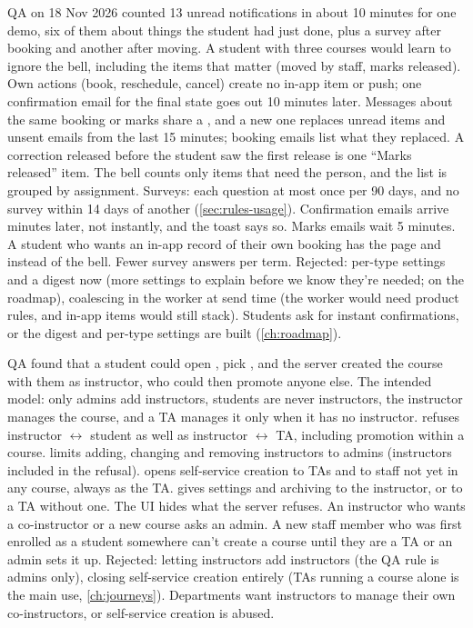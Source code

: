   {QA on 18 Nov 2026 counted 13 unread notifications in about 10 minutes for one demo, six of them
   about things the student had just done, plus a survey after booking and another after moving.
   A student with three courses would learn to ignore the bell, including the items that matter
   (moved by staff, marks released).}
  {Own actions (book, reschedule, cancel) create no in-app item or push; one confirmation email for
   the final state goes out 10 minutes later. Messages about the same booking or marks share a
   , and a new one replaces unread items and unsent emails from the last 15
   minutes; booking emails list what they replaced. A correction released before the student saw
   the first release is one ``Marks released'' item. The bell counts only items that need the
   person, and the list is grouped by assignment. Surveys: each question at most once per 90 days,
   and no survey within 14 days of another (\cref{sec:rules-usage}).}
  {Confirmation emails arrive minutes later, not instantly, and the toast says so. Marks emails wait
   5 minutes. A student who wants an in-app record of their own booking has the page and
    instead of the bell. Fewer survey answers per term. Rejected: per-type
   settings and a digest now (more settings to explain before we know they're needed; on the
   roadmap), coalescing in the worker at send time (the worker would need product rules, and
   in-app items would still stack).}
  {Students ask for instant confirmations, or the digest and per-type settings are built
   (\cref{ch:roadmap}).}

  {QA found that a student could open , pick , and the server
   created the course with them as instructor, who could then promote anyone else. The intended
   model: only admins add instructors, students are never instructors, the instructor manages the
   course, and a TA manages it only when it has no instructor.}
  { refuses instructor $\leftrightarrow$ student as well as instructor
   $\leftrightarrow$ TA, including promotion within a course.  limits
   adding, changing and removing instructors to admins (instructors included in the refusal).
    opens self-service creation to TAs and to staff not yet in any course,
   always as the TA.  gives settings and archiving to the instructor, or to
   a TA without one. The UI hides what the server refuses.}
  {An instructor who wants a co-instructor or a new course asks an admin. A new staff member who
   was first enrolled as a student somewhere can't create a course until they are a TA or an admin
   sets it up. Rejected: letting instructors add instructors (the QA rule is admins only), closing
   self-service creation entirely (TAs running a course alone is the main use, \cref{ch:journeys}).}
  {Departments want instructors to manage their own co-instructors, or self-service creation is
   abused.}

